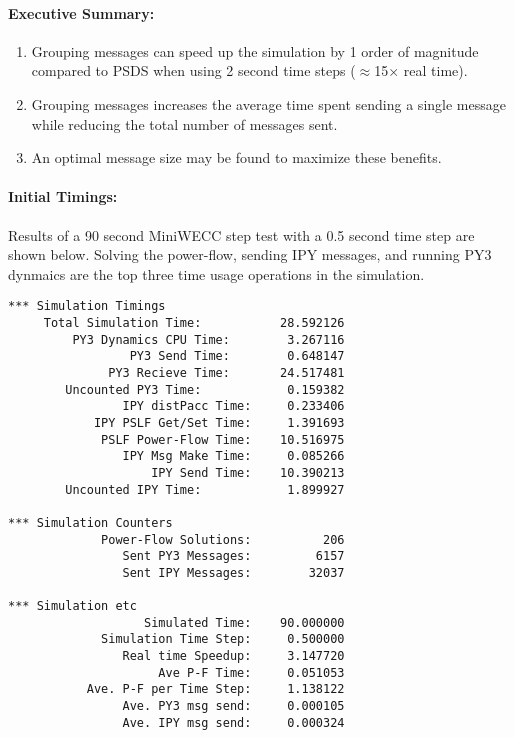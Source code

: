 \documentclass[12pt]{article}
\begin{document}
\paragraph{Executive Summary:} 
\begin{enumerate}
\item Grouping messages can speed up the simulation by 1 order of magnitude compared to PSDS when using 2 second time steps ($\approx$15$\times$ real time).
\item  Grouping messages increases the average time spent sending a single message while reducing the total number of messages sent. 
\item  An optimal message size may be found to maximize these benefits.
\end{enumerate}


\paragraph{Initial Timings:} Results of a 90 second MiniWECC step test with a 0.5 second time step are shown below. Solving the power-flow, sending IPY messages, and running PY3 dynmaics are the top three time usage operations in the simulation. 
\begin{lstlisting}[caption=Initial terminal output of timings and counters.]
*** Simulation Timings
     Total Simulation Time:           28.592126
         PY3 Dynamics CPU Time:        3.267116
                 PY3 Send Time:        0.648147
              PY3 Recieve Time:       24.517481
        Uncounted PY3 Time:            0.159382
                IPY distPacc Time:     0.233406
            IPY PSLF Get/Set Time:     1.391693
             PSLF Power-Flow Time:    10.516975
                IPY Msg Make Time:     0.085266
                    IPY Send Time:    10.390213
        Uncounted IPY Time:            1.899927

*** Simulation Counters
             Power-Flow Solutions:          206
                Sent PY3 Messages:         6157
                Sent IPY Messages:        32037

*** Simulation etc
                   Simulated Time:    90.000000
             Simulation Time Step:     0.500000
                Real time Speedup:     3.147720
                     Ave P-F Time:     0.051053
           Ave. P-F per Time Step:     1.138122
                Ave. PY3 msg send:     0.000105
                Ave. IPY msg send:     0.000324
\end{lstlisting}
\end{document}
